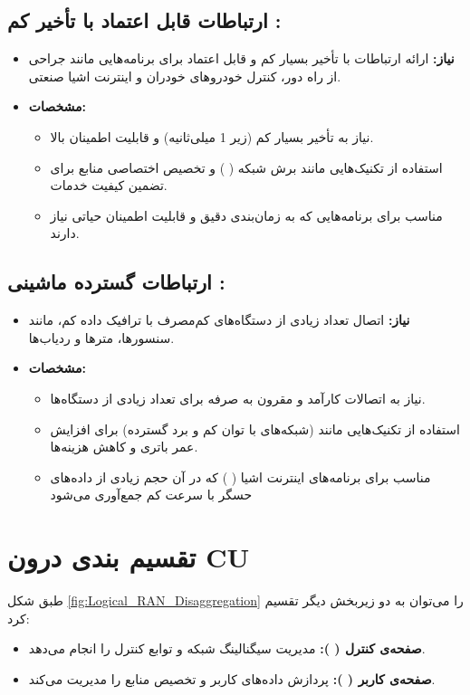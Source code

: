 \documentclass[landscape, 12pt]{report}
\begin{document}
 	\section*{
 	ارتباطات قابل اعتماد با تأخیر کم 
 	:}
 	\begin{itemize}
 		\item \textbf{نیاز:}
 		ارائه ارتباطات با تأخیر بسیار کم و قابل اعتماد برای برنامه‌هایی مانند جراحی از راه دور، کنترل خودروهای خودران و اینترنت اشیا صنعتی.
 		\item \textbf{مشخصات:}
 		\begin{itemize}
 			\item 
نیاز به تأخیر بسیار کم (زیر 1 میلی‌ثانیه) و قابلیت اطمینان بالا.
 			\item 
 استفاده از تکنیک‌هایی مانند برش شبکه (
 ) و تخصیص اختصاصی منابع برای تضمین کیفیت خدمات.
 			\item 
 	مناسب برای برنامه‌هایی که به زمان‌بندی دقیق و قابلیت اطمینان حیاتی نیاز دارند.
 		\end{itemize}
 	\end{itemize}
 	
 	\section*{
 		ارتباطات گسترده ماشینی
 		 :}
 	\begin{itemize}
 		\item \textbf{نیاز:}
 		اتصال تعداد زیادی از دستگاه‌های کم‌مصرف با ترافیک داده کم، مانند سنسورها، مترها و ردیاب‌ها.
 		\item \textbf{مشخصات:}
 		\begin{itemize}
 			\item 
 	نیاز به اتصالات کارآمد و مقرون به صرفه برای تعداد زیادی از دستگاه‌ها.
 			\item 
 	استفاده از تکنیک‌هایی مانند
 	  (شبکه‌های با توان کم و برد گسترده) برای افزایش عمر باتری و کاهش هزینه‌ها.
 			\item 
 			مناسب برای برنامه‌های اینترنت اشیا (
 			) که در آن حجم زیادی از داده‌های حسگر با سرعت کم جمع‌آوری می‌شود
 		\end{itemize}
 	\end{itemize}
 	
 	
\chapter*{تقسیم بندی درون CU}
طبق شکل \ref{fig:Logical_RAN_Disaggregation}
 را می‌توان به دو زیربخش دیگر تقسیم کرد:
\begin{itemize}
	\item 
	\textbf{صفحه‌ی کنترل (
	):}
	 مدیریت سیگنالینگ شبکه و توابع کنترل را انجام می‌دهد.
	\item 
	\textbf{صفحه‌ی کاربر (
	): }
	پردازش داده‌های کاربر و تخصیص منابع را مدیریت می‌کند.
\end{itemize}
\end{document}
